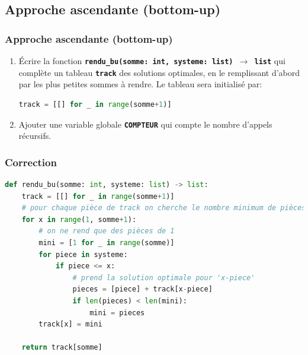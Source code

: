 \documentclass[svgnames,11pt]{beamer}
\begin{document}
\subsection{Approche ascendante (bottom-up)}
\begin{frame}[fragile]
    \frametitle{Approche ascendante (bottom-up)}

    \begin{activite}
        \begin{enumerate}
            \item Écrire la fonction \textbf{\texttt{rendu\_bu(somme: int, systeme: list) $\rightarrow$ list}} qui complète un tableau \textbf{\texttt{track}} des solutions optimales, en le remplissant d'abord par les plus petites sommes à rendre. Le tableau sera initialisé par:

\begin{lstlisting}[language=Python , basicstyle=\ttfamily\small, xleftmargin=2em, xrightmargin=2em]
track = [[] for _ in range(somme+1)]
\end{lstlisting}
            \item Ajouter une variable globale \textbf{\texttt{COMPTEUR}} qui compte le nombre d'appels récursifs.
        \end{enumerate}
    \end{activite}

\end{frame}
\begin{frame}[fragile]
    \frametitle{Correction}

\begin{center}
\begin{lstlisting}[language=Python , basicstyle=\ttfamily\small, xleftmargin=0.2em, xrightmargin=0em]
def rendu_bu(somme: int, systeme: list) -> list:
    track = [[] for _ in range(somme+1)]
    # pour chaque pièce de track on cherche le nombre minimum de pièces à rendre
    for x in range(1, somme+1):
        # on ne rend que des pièces de 1
        mini = [1 for _ in range(somme)]
        for piece in systeme:
            if piece <= x:
                # prend la solution optimale pour 'x-piece'
                pieces = [piece] + track[x-piece]
                if len(pieces) < len(mini):
                    mini = pieces
        track[x] = mini

    return track[somme]
\end{lstlisting}
\end{center}  

\end{frame}
\end{document}
